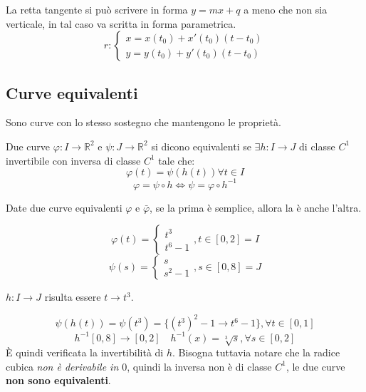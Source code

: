 \begin{observation}
La retta tangente si può scrivere in forma $y=mx+q$ a meno che non sia verticale, in tal caso va scritta in forma parametrica.
\begin{equation}
	r: \begin{cases} x=x(t_0)+x'(t_0)(t-t_0) \\ y=y(t_0)+y'(t_0)(t-t_0) \end{cases}
\end{equation}
\end{observation}



\subsection{Curve equivalenti}
Sono curve con lo stesso sostegno che mantengono le proprietà.

\begin{definition}
Due curve $\varphi : I \rightarrow \mathbb{R}^2$ e $\psi : J \rightarrow \mathbb{R}^2$ si dicono equivalenti se $\exists h : I \rightarrow J$ di classe $C^1$ invertibile con inversa di classe $C^1$ tale che:
\[
	\varphi(t)=\psi(h(t)) \forall t\in I
\]
\[
	\varphi = \psi \circ h \Leftrightarrow \psi = \varphi \circ h ^{-1}
\]
\end{definition}

\begin{observation}
Date due curve equivalenti $\varphi$ e $\bar{\varphi}$, se la prima è semplice, allora la è anche l'altra.	
\end{observation}


\begin{example}
\[
	\varphi(t) = \begin{cases} t^3 \\ t^6 - 1 \end{cases}, t\in [0, 2] = I
\]
\[
	\psi(s) = \begin{cases} s \\ s^2 - 1 \end{cases}, s\in [0, 8] = J
\]

$h: I \rightarrow J$ risulta essere $t\rightarrow t^3$.

\[
	\psi(h(t)) = \psi(t^3) = \{(t^3)^2 - 1\rightarrow t ^6 - 1\}, \forall t\in [0, 1]
\]\[
	h^{-1}[0, 8] \rightarrow [0, 2]\quad
	h^{-1}(x) = \sqrt[3]{s}, \forall s\in [0, 2]
\]
È quindi verificata la invertibilità di $h$. Bisogna tuttavia notare che la radice cubica \emph{non è derivabile in $0$}, quindi la inversa non è di classe $C^1$, le due curve \textbf{non sono equivalenti}.
\end{example}

